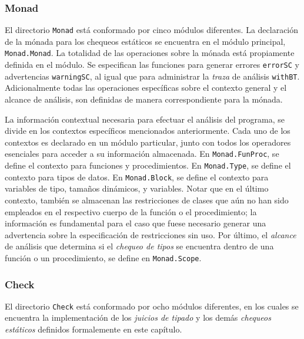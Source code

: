 \subsubsection{Monad}

El directorio \lstinline[style = module]{Monad} está conformado por cinco módulos diferentes.
La declaración de la mónada para los chequeos estáticos se encuentra en el módulo principal, \lstinline[style = module]{Monad.Monad}.
La totalidad de las operaciones sobre la mónada está propiamente definida en el módulo.
Se especifican las funciones para generar errores \lstinline[style = haskell]{errorSC} y advertencias \lstinline[style = haskell]{warningSC}, al igual que para administrar la \textit{traza} de análisis \lstinline[style = haskell]{withBT}.
Adicionalmente todas las operaciones específicas sobre el contexto general y el alcance de análisis, son definidas de manera correspondiente para la mónada.

La información contextual necesaria para efectuar el análisis del programa, se divide en los contextos específicos mencionados anteriormente.
Cada uno de los contextos es declarado en un módulo particular, junto con todos los operadores esenciales para acceder a su información almacenada.
En \lstinline[style = module]{Monad.FunProc}, se define el contexto para funciones y procedimientos.
En \lstinline[style = module]{Monad.Type}, se define el contexto para tipos de datos.
En \lstinline[style = module]{Monad.Block}, se define el contexto para variables de tipo, tamaños dinámicos, y variables.
Notar que en el último contexto, también se almacenan las restricciones de clases que aún no han sido empleados en el respectivo cuerpo de la función o el procedimiento; la información es fundamental para el caso que fuese necesario generar una advertencia sobre la especificación de restricciones sin uso.
Por último, el \textit{alcance} de análisis que determina si el \textit{chequeo de tipos} se encuentra dentro de una función o un procedimiento, se define en \lstinline[style = module]{Monad.Scope}.

\subsubsection{Check}

El directorio \lstinline[style = module]{Check} está conformado por ocho módulos diferentes, en los cuales se encuentra la implementación de los
\textit{juicios de tipado} y los demás \textit{chequeos estáticos} definidos
formalemente en este capítulo.

